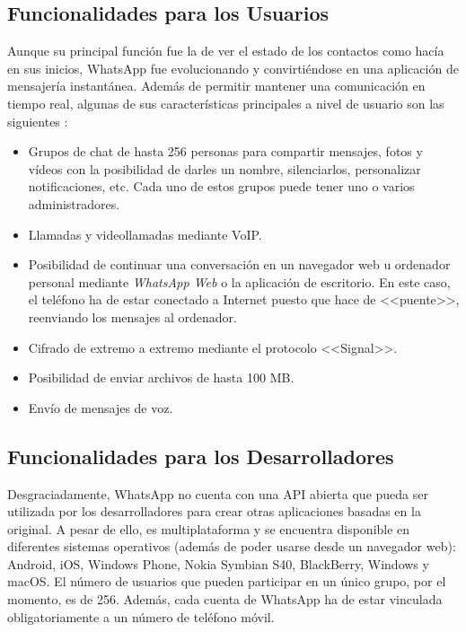 \subsection{Funcionalidades para los Usuarios}
Aunque su principal función fue la de ver el estado de los contactos como hacía en sus inicios, WhatsApp fue evolucionando y convirtiéndose en una aplicación de mensajería instantánea. Además de permitir mantener una comunicación en tiempo real, algunas de sus características principales a nivel de usuario son las siguientes \cite{WhatsApp2017}:

\begin{itemize}
	\item Grupos de chat de hasta 256 personas para compartir mensajes, fotos y vídeos con la posibilidad de darles un nombre, silenciarlos, personalizar notificaciones, etc. Cada uno de estos grupos puede tener uno o varios administradores.
	\item Llamadas y videollamadas mediante \acf{VoIP}.
	\item Posibilidad de continuar una conversación en un navegador web u ordenador personal mediante \textit{WhatsApp Web} o la aplicación de escritorio. En este caso, el teléfono ha de estar conectado a Internet puesto que hace de <<puente>>, reenviando los mensajes al ordenador.
	\item Cifrado de extremo a extremo mediante el protocolo <<Signal>>.
	\item Posibilidad de enviar archivos de hasta 100 \acs{MB}.
	\item Envío de mensajes de voz.
\end{itemize}


\subsection{Funcionalidades para los Desarrolladores}
Desgraciadamente, WhatsApp no cuenta con una \acs{API} abierta que pueda ser utilizada por los desarrolladores para crear otras aplicaciones basadas en la original. A pesar de ello, es multiplataforma y se encuentra disponible en diferentes sistemas operativos (además de poder usarse desde un navegador web): Android, iOS, Windows Phone, Nokia Symbian S40, BlackBerry, Windows y macOS. El número de usuarios que pueden participar en un único grupo, por el momento, es de 256. Además, cada cuenta de WhatsApp ha de estar vinculada obligatoriamente a un número de teléfono móvil.

